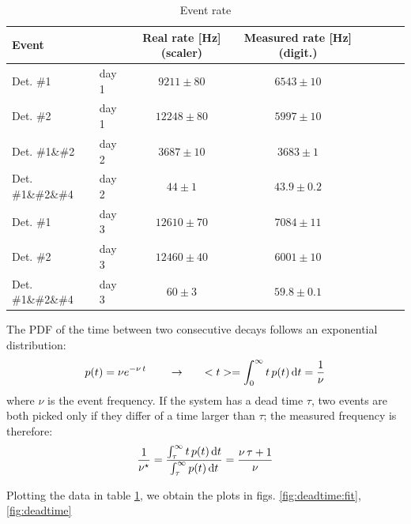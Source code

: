 \documentclass[11pt,a4 paper]{article}
\let\oldfrac\frac
\renewcommand{\frac}[3][d]{\ifthenelse{\equal{#1}{d}}{\oldfrac{#2}{#3}}{\nicefrac{#2}{#3}}}
\begin{document}
\begin{table}[H]
    \centering
    \begin{tabular}{llcccccc}
        \toprule
        Event && Real rate [\si{Hz}] (scaler)& Measured rate [\si{Hz}] (digit.) \\
        \midrule
        Det. \#1 &day 1& $9211 \pm 80$ & $6543 \pm 10$ \\
        Det. \#2 &day 1& $12248 \pm 80$ & $5997 \pm 10$\\
        Det. \#1\&\#2 &day 2& $3687 \pm 10$ & $3683 \pm 1$ \\
        Det. \#1\&\#2\&\#4 &day 2& $44 \pm 1$ & $43.9 \pm 0.2$ \\
        Det. \#1 &day 3& $12610 \pm 70$ & $7084 \pm 11$ \\
        Det. \#2 &day 3& $12460 \pm 40$ & $6001 \pm 10$ \\
        Det. \#1\&\#2\&\#4 &day 3& $60 \pm 3$ & $59.8 \pm 0.1$ \\
        \bottomrule
    \end{tabular}
    \caption{Event rate}
    \label{tab:rate}
\end{table}

The PDF of the time between two consecutive decays follows an exponential distribution:
\begin{equation*}
    p(t) = \nu e^{-\nu \,t} \qquad \rightarrow \qquad <t> = \int_0^{\infty} t\,p(t) \dd{t} = \frac{1}{\nu}
\end{equation*}
where $\nu$ is the event frequency. If the system has a dead time $\tau$, two events are both picked only if they differ of a time larger than $\tau$; the measured frequency is therefore:
\begin{equation*}
    \frac{1}{\nu^\star} = \frac{\int_{\tau}^{\infty} t \,p(t) \dd{t}}{\int_{\tau}^{\infty} p(t) \dd{t}} =\frac{\nu\,\tau + 1}{\nu}
\end{equation*}

Plotting the data in table \ref{tab:rate}, we obtain the plots in figs. \ref{fig:deadtime:fit}, \ref{fig:deadtime}

\end{document}
